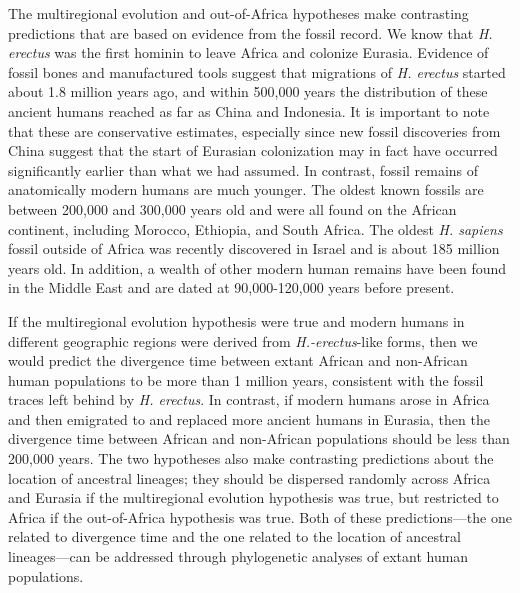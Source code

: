 \documentclass[
]{book}
\begin{document}
The multiregional evolution and out-of-Africa hypotheses make contrasting predictions that are based on evidence from the fossil record. We know that \emph{H. erectus} was the first hominin to leave Africa and colonize Eurasia. Evidence of fossil bones and manufactured tools suggest that migrations of \emph{H. erectus} started about 1.8 million years ago, and within 500,000 years the distribution of these ancient humans reached as far as China and Indonesia. It is important to note that these are conservative estimates, especially since new fossil discoveries from China suggest that the start of Eurasian colonization may in fact have occurred significantly earlier than what we had assumed. In contrast, fossil remains of anatomically modern humans are much younger. The oldest known fossils are between 200,000 and 300,000 years old and were all found on the African continent, including Morocco, Ethiopia, and South Africa. The oldest \emph{H. sapiens} fossil outside of Africa was recently discovered in Israel and is about 185 million years old. In addition, a wealth of other modern human remains have been found in the Middle East and are dated at 90,000-120,000 years before present.

If the multiregional evolution hypothesis were true and modern humans in different geographic regions were derived from \emph{H.-erectus}-like forms, then we would predict the divergence time between extant African and non-African human populations to be more than 1 million years, consistent with the fossil traces left behind by \emph{H. erectus}. In contrast, if modern humans arose in Africa and then emigrated to and replaced more ancient humans in Eurasia, then the divergence time between African and non-African populations should be less than 200,000 years. The two hypotheses also make contrasting predictions about the location of ancestral lineages; they should be dispersed randomly across Africa and Eurasia if the multiregional evolution hypothesis was true, but restricted to Africa if the out-of-Africa hypothesis was true. Both of these predictions---the one related to divergence time and the one related to the location of ancestral lineages---can be addressed through phylogenetic analyses of extant human populations.
\end{document}
